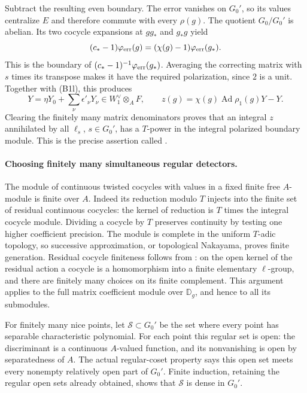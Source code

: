 Subtract the resulting even boundary.
The error vanishes on \(G_0'\), so its values centralize \(E\)
and therefore commute with every \(\rho(g)\).
The quotient \(G_0/G_0'\) is abelian.
Its two cocycle expansions at \(g g_*\) and \(g_*g\) yield
\[
      (c_*-1)\varphi_{\rm err}(g)
                =(\chi(g)-1)\varphi_{\rm err}(g_*).
\]
This is the boundary of
\((c_*-1)^{-1}\varphi_{\rm err}(g_*)\).
Averaging the correcting matrix with \(s\) times its transpose
makes it have the required polarization, since \(2\) is a unit.
Together with (B1l), this produces
\[
 Y=\eta Y_0+\sum_\nu\epsilon'_\nu Y_\nu\in W_1^\vee\otimes_A F,
 \qquad
             z(g)=\chi(g)\operatorname{Ad}\rho_1(g)Y-Y .
 \tag{B1m}
\]
Clearing the finitely many matrix denominators proves that an
integral \(z\) annihilated by all \(\ell_s\), \(s\in G_0'\),
has a \(T\)-power in the integral polarized boundary module.
This is the precise assertion called .

\paragraph{Choosing finitely many simultaneous regular detectors.}
The module of continuous twisted cocycles with values in a fixed
finite free \(A\)-module is finite over \(A\).
Indeed its reduction modulo \(T\) injects into the finite set
of residual continuous cocycles: the kernel of reduction is
\(T\) times the integral cocycle module.
Dividing a cocycle by \(T\) preserves continuity by testing
one higher coefficient precision.
The module is complete in the uniform \(T\)-adic topology,
so successive approximation, or topological Nakayama, proves
finite generation.
Residual cocycle finiteness follows from :
on the open kernel of the residual action a cocycle is a
homomorphism into a finite elementary \(\ell\)-group, and
there are finitely many choices on its finite complement.
This argument applies to the full matrix coefficient module
over \(\mathbb D_g\), and hence to all its submodules.

For finitely many nice points, let \(\mathcal S\subset G_0'\)
be the set where every point has separable characteristic
polynomial.
For each point this regular set is open: the discriminant is
a continuous \(A\)-valued function, and its nonvanishing is
open by separatedness of \(A\).
The actual regular-coset property  says this open
set meets every nonempty relatively open part of \(G_0'\).
Finite induction, retaining the regular open sets already
obtained, shows that \(\mathcal S\) is dense in \(G_0'\).

